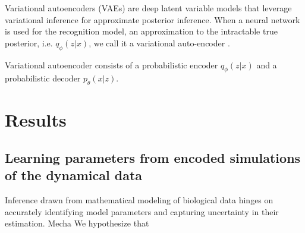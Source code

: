 \documentclass[12pt]{article} %
\newcommand{\red}[1]{{\color{red}{#1}}}
\begin{document}
Variational autoencoders (VAEs) are deep latent variable models that leverage variational inference for approximate posterior inference. When a neural network is used for the recognition model, an approximation to the intractable true posterior, i.e. $q_{\phi}(z|x)$, we call it a variational auto-encoder \citep{kingma2013auto}. 

Variational autoencoder consists of a probabilistic encoder $q_{\phi}(z|x)$ and a probabilistic decoder $p_{\theta}(x|z)$. 







\section{Results}
\subsection*{Learning \red{and inferring} parameters from encoded simulations of the dynamical data}

Inference drawn from mathematical modeling of biological data hinges on accurately identifying model parameters and capturing uncertainty in their estimation.
Mecha
We hypothesize that 
\end{document}
